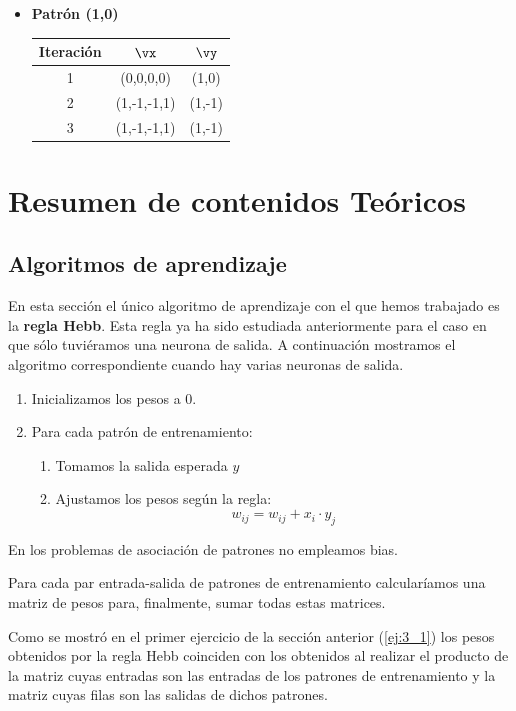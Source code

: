 \begin{problem}[11]
\begin{multicols}{2}
\begin{itemize}
\item \textbf{Patrón (1,0)}

\begin{tabular}{|ccc|}
\hline
\textbf{Iteración} & $\vx$ & $\vy$ \\
\hline
1 & (0,0,0,0) & (1,0) \\
\hline
2 & (1,-1,-1,1) & (1,-1) \\
\hline
3 & (1,-1,-1,1) & (1,-1) \\
\hline
\end{tabular}
\end{itemize}
\end{multicols}
\end{problem}

\section{Resumen de contenidos Teóricos}
\subsection{Algoritmos de aprendizaje}
En esta sección el único algoritmo de aprendizaje con el que hemos trabajado es la \textbf{regla Hebb}. Esta regla ya ha sido estudiada anteriormente para el caso en que sólo tuviéramos una neurona de salida. A continuación mostramos el algoritmo correspondiente cuando hay varias neuronas de salida.
\begin{enumerate}
\item Inicializamos los pesos a 0.
\item Para cada patrón de entrenamiento:
\begin{enumerate}
\item Tomamos la salida esperada $y$
\item Ajustamos los pesos según la regla:
\[w_{ij} = w_{ij} + x_i\cdot y_j\]
\end{enumerate}
\end{enumerate}

\obs En los problemas de asociación de patrones no empleamos bias.

Para cada par entrada-salida de patrones de entrenamiento calcularíamos una matriz de pesos para, finalmente, sumar todas estas matrices.

Como se mostró en el primer ejercicio de la sección anterior (\ref{ej:3_1}) los pesos obtenidos por la regla Hebb coinciden con los obtenidos al realizar el producto de la matriz cuyas entradas son las entradas de los patrones de entrenamiento y la matriz cuyas filas son las salidas de dichos patrones.

